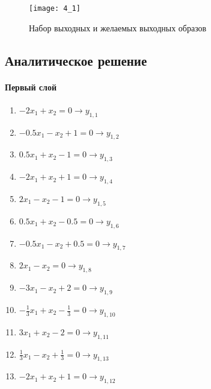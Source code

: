 \begin{figure}[H]
\begin{center}
	\texttt{[image: 4\_1]}
	\caption{Набор выходных и желаемых выходных образов}
	\label{fig:4_1}
\end{center}
\end{figure}

\subsection{Аналитическое решение}


\paragraph{Первый слой}
\begin{enumerate}
	\item $-2 x_1 + x_2 = 0 \rightarrow y_{1,1}$
	\item $-0.5 x_1 - x_2 + 1 = 0 \rightarrow y_{1,2}$\\
	\item $0.5 x_1 + x_2 - 1 = 0 \rightarrow y_{1,3}$
	\item $-2 x_1 + x_2 + 1 = 0 \rightarrow y_{1,4}$\\
	\item $2 x_1 - x_2 - 1 = 0 \rightarrow y_{1,5}$
	\item $0.5 x_1 + x_2 - 0.5 = 0 \rightarrow y_{1,6}$\\
	\item $-0.5 x_1 - x_2 + 0.5 = 0 \rightarrow y_{1,7}$
	\item $2 x_1 - x_2 = 0 \rightarrow y_{1,8}$\\
	\item $-3 x_1 - x_2 + 2 = 0 \rightarrow y_{1,9}$
	\item $-\frac{1}{3} x_1 + x_2 - \frac{1}{3} = 0 \rightarrow y_{1,10}$\\
	\item $3 x_1 + x_2 - 2 = 0 \rightarrow y_{1,11}$\\
	\item $\frac{1}{3} x_1 - x_2 + \frac{1}{3} = 0 \rightarrow y_{1,13}$
	\item $-2 x_1 + x_2 + 1 = 0 \rightarrow y_{1,12}$\\
\end{enumerate}

